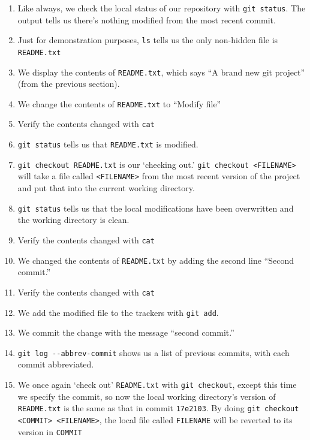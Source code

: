 \documentclass[11pt,fleqn]{article}
\theoremstyle{definition}
\begin{document}
\begin{enumerate}
\item Like always, we check the local status of our repository with \verb|git status|.
    The output tells us there's nothing modified from the most recent
    commit.

\item Just for demonstration purposes, \verb|ls| tells us the only non-hidden
    file is \verb|README.txt|

\item We display the contents of \verb|README.txt|, which says ``A brand new git
    project'' (from the previous section).

\item We change the contents of \verb|README.txt| to ``Modify file''

\item Verify the contents changed with \verb|cat|

\item \verb|git status| tells us that \verb|README.txt| is modified.

\item \verb|git checkout README.txt| is our `checking out.' \verb|git checkout <FILENAME>|
    will take a file called \verb|<FILENAME>| from the most recent
    version of the project and put that into the current working directory.

\item \verb|git status| tells us that the local modifications have been
    overwritten and the working directory is clean.

\item Verify the contents changed with \verb|cat|

\item We changed the contents of \verb|README.txt| by adding the second line
    ``Second commit.''

\item Verify the contents changed with \verb|cat|

\item We add the modified file to the trackers with \verb|git add|.

\item We commit the change with the message ``second commit.''

\item \verb|git log --abbrev-commit| shows us a list of previous commits, with
    each commit abbreviated.

\item We once again `check out' \verb|README.txt| with \verb|git checkout|,
    except this time we specify the commit, so now the local working directory's
    version of \verb|README.txt| is the same as that in commit \verb|17e2103|.
    By doing \verb|git checkout <COMMIT> <FILENAME>|, the local file called
    \verb|FILENAME| will be reverted to its version in \verb|COMMIT|


\end{enumerate}
\end{document}
